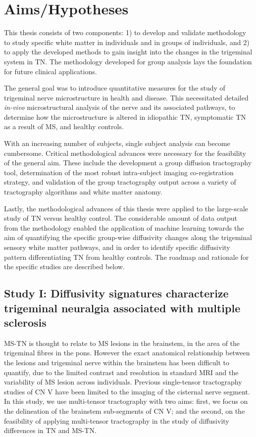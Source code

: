 \chapter{Aims/Hypotheses}

This thesis consists of two components: 1) to develop and validate methodology to study specific white matter in individuals and in groups of individuals, and 2) to apply the developed methods to gain insight into the changes in the trigeminal system in TN. The methodology developed for group analysis lays the foundation for future clinical applications. 

The general goal was to introduce quantitative measures for the study of trigeminal nerve microstructure in health and disease. This necessitated detailed \textit{in-vivo} microstructural analysis of the nerve and its associated pathways, to determine how the microstructure is altered in idiopathic TN, symptomatic TN as a result of MS, and healthy controls. 

With an increasing number of subjects, single subject analysis can become cumbersome. Critical methodological advances were necessary for the feasibility of the general aim. These include the development a group diffusion tractography tool, determination of the most robust intra-subject imaging co-registration strategy, and validation of the group tractography output across a variety of tractography algorithms and white matter anatomy. 

Lastly, the methodological advances of this thesis were applied to the large-scale study of TN versus healthy control.  The considerable amount of data output from the methodology  enabled the application of machine learning towards the aim of quantifying the specific group-wise diffusivity changes along the trigeminal sensory white matter pathways, and in order to identify specific diffusivity pattern differentiating TN from healthy controls. The roadmap and rationale for the specific studies are described below.

\section{Study I: Diffusivity signatures characterize trigeminal neuralgia associated with multiple sclerosis}
MS-TN is thought to relate to MS lesions in the brainstem, in the area of the trigeminal fibres in the pons. However the exact anatomical relationship between the lesions and trigeminal nerve within the brainstem has been difficult to quantify, due to the limited contrast and resolution in standard MRI and the variability of MS lesion across individuals. Previous single-tensor tractography studies of CN V have been limited to the imaging of the cisternal nerve segment. In this study, we use multi-tensor tractography with two aims: first, we focus on the delineation of the brainstem sub-segments of CN V; and the second, on the feasibility of applying multi-tensor tractography in the study of diffusivity differences in TN and MS-TN. 

